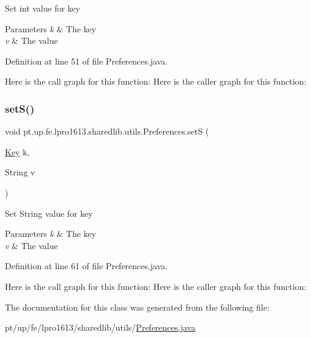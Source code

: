 Set int value for key


\begin{DoxyParams}{Parameters}
{\em k} & The key \\
\hline
{\em v} & The value \\
\hline
\end{DoxyParams}


Definition at line 51 of file Preferences.\+java.

Here is the call graph for this function\+:
Here is the caller graph for this function\+:
\hypertarget{classpt_1_1up_1_1fe_1_1lpro1613_1_1sharedlib_1_1utils_1_1_preferences_a7ef4c07c94b75f3bb5cf27c4533f01b6}{}\label{classpt_1_1up_1_1fe_1_1lpro1613_1_1sharedlib_1_1utils_1_1_preferences_a7ef4c07c94b75f3bb5cf27c4533f01b6} 
\subsubsection{\texorpdfstring{set\+S()}{setS()}}
{\footnotesize\ttfamily void pt.\+up.\+fe.\+lpro1613.\+sharedlib.\+utils.\+Preferences.\+setS (\begin{DoxyParamCaption}\item[{\hyperlink{interfacept_1_1up_1_1fe_1_1lpro1613_1_1sharedlib_1_1utils_1_1_preferences_1_1_key}{Key}}]{k,  }\item[{String}]{v }\end{DoxyParamCaption})}

Set String value for key


\begin{DoxyParams}{Parameters}
{\em k} & The key \\
\hline
{\em v} & The value \\
\hline
\end{DoxyParams}


Definition at line 61 of file Preferences.\+java.

Here is the call graph for this function\+:
Here is the caller graph for this function\+:


The documentation for this class was generated from the following file\+:\begin{DoxyCompactItemize}
\item 
pt/up/fe/lpro1613/sharedlib/utils/\hyperlink{_preferences_8java}{Preferences.\+java}\end{DoxyCompactItemize}
